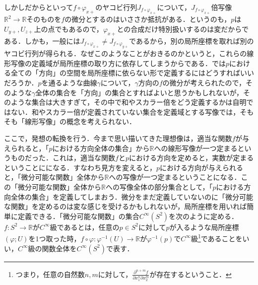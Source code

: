 \documentclass{jsarticle}
\def\realnum{{\mathbb R}}
\def\dfrac{\displaystyle\frac}
\begin{document}
しかしだからといって$f\circ \varphi_{x+}$のヤコビ行列$J_{f\circ \varphi_{x+}}$について，$J_{f\circ\varphi_{x+}}$倍写像$\realnum^2\rightarrow \realnum$そのものを$f$の微分とするのはいささか抵抗がある．というのも，$p$は$U_{y+},U_{z+}$上の点でもあるので，$\varphi_{x+}$との合成だけ特別扱いするのは変だからである．しかも，一般には$J_{f\circ\varphi_{x+}}\neq J_{f\circ\varphi_{y+}}$であるから，別の局所座標を取れば別のヤコビ行列が得られる．なぜこのようなことがおきるのかというと，これらの線形写像の定義域が局所座標の取り方に依存してしまうからである．では$p$における全ての「方向」の空間を局所座標に依らない形で定義するにはどうすればいいだろうか．$p$を通るような曲線$\gamma$について，$\gamma$方向の$f$の微分が考えられたので，そのような$\gamma$全体の集合を「方向」の集合とすればよいと思うかもしれないが，そのような集合は大きすぎて，その中で和やスカラー倍をどう定義するかは自明ではない．和やスカラー倍が定義されていない集合を定義域とする写像では，そもそも「線形写像」の概念を考えられない．


ここで，発想の転換を行う．今まで思い描いてきた理想像は，適当な関数$f$が与えられると，「$p$における方向全体の集合」から$\realnum$への線形写像が一つ定まるというものだった．これは，適当な関数$f$と$p$における方向を定めると，実数が定まるということにになる．すなわち見方を変えると，$p$における方向が与えられると，「微分可能な関数」全体から$\realnum$への写像が一つ定まるということになる．この「微分可能な関数」全体から$\realnum$への写像全体の部分集合として，「$p$における方向全体の集合」を定義してしまおう．微分をまだ定義していないのに「微分可能な関数」を定めるのは変な感じを受けるかもしれないが，局所座標を用いれば簡単に定義できる．「微分可能な関数」の集合$C^\infty(S^2)$を次のように定める．$f:S^2\rightarrow \realnum$が$C^{\infty}$級であるとは，任意の$p\in S^2$に対して$p$が入るような局所座標$(\varphi;U)$を1つ取った時，$f\circ\varphi:\varphi^{-1}(U)\rightarrow \realnum$が$\varphi^{-1}(p)$で$C^{\infty}$級\footnote{つまり，任意の自然数$n,m$に対して，$\dfrac{\partial^{n+m}f}{\partial x_1^n\partial x_2^m}$が存在するということ．}であることをいい，$C^\infty$級の関数全体を$C^\infty(S^2)$で表す．
\end{document}
